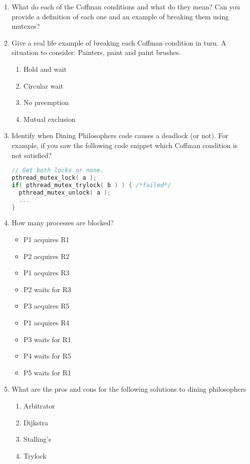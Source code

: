 \begin{enumerate}

\item What do each of the Coffman conditions and what do they mean? Can you provide a definition of each one and an example of breaking them using mutexes?

\item Give a real life example of breaking each Coffman condition in turn. A situation to consider: Painters, paint and paint brushes.

  \begin{enumerate}
  \item Hold and wait
  \item Circular wait
  \item No preemption 
  \item Mutual exclusion
  \end{enumerate}

\item Identify when Dining Philosophers code causes a deadlock (or not). For example, if you saw the following code snippet which Coffman condition is not satisfied?

\begin{lstlisting}[language=C]
// Get both locks or none.
pthread_mutex_lock( a );
if( pthread_mutex_trylock( b ) ) { /*failed*/
  pthread_mutex_unlock( a );
  ...
}
\end{lstlisting}

\item How many processes are blocked?

\begin{itemize}
\tightlist
\item
  P1 acquires R1
\item
  P2 acquires R2
\item
  P1 acquires R3
\item
  P2 waits for R3
\item
  P3 acquires R5
\item
  P1 acquires R4
\item
  P3 waits for R1
\item
  P4 waits for R5
\item
  P5 waits for R1
\end{itemize}

\item What are the pros and cons for the following solutions to dining philosophers
  \begin{enumerate}
  \item Arbitrator
  \item Dijkstra
  \item Stalling's
  \item Trylock
  \end{enumerate}
\end{enumerate}


